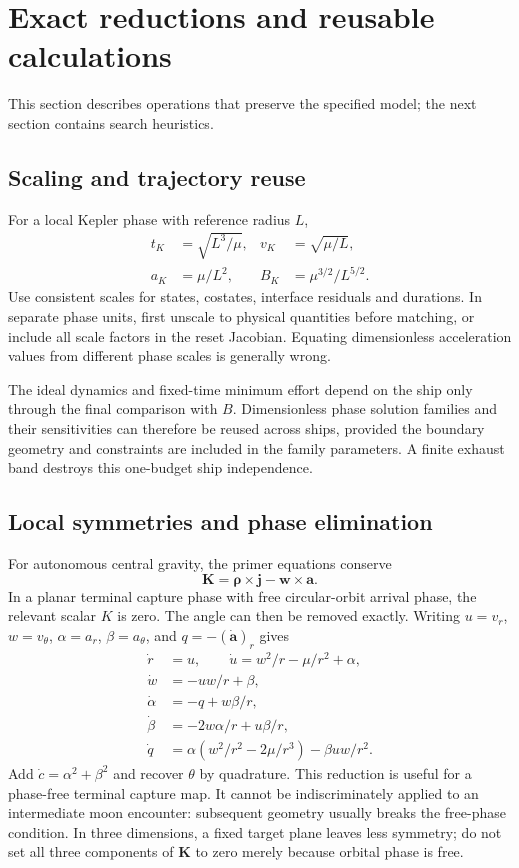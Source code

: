 \documentclass[journal, a4paper]{IEEEtran}
\newcommand{\cross}{\mathbin{\times}}
\begin{document}
\section{Exact reductions and reusable calculations}
This section describes operations that preserve the specified model; the next section contains search heuristics.

\subsection{Scaling and trajectory reuse}
For a local Kepler phase with reference radius $L$,
\begin{align}
 t_K&=\sqrt{L^3/\mu}, &v_K&=\sqrt{\mu/L},\nonumber\\
 a_K&=\mu/L^2, & B_K&=\mu^{3/2}/L^{5/2}.
\end{align}
Use consistent scales for states, costates, interface residuals and durations. In separate phase units, first unscale to physical quantities before matching, or include all scale factors in the reset Jacobian. Equating dimensionless acceleration values from different phase scales is generally wrong.

The ideal dynamics and fixed-time minimum effort depend on the ship only through the final comparison with $B$. Dimensionless phase solution families and their sensitivities can therefore be reused across ships, provided the boundary geometry and constraints are included in the family parameters. A finite exhaust band destroys this one-budget ship independence.

\subsection{Local symmetries and phase elimination}
For autonomous central gravity, the primer equations conserve
\begin{equation}
 \mathbf K=\boldsymbol\rho\cross\mathbf j-\mathbf w\cross\mathbf a.
\end{equation}
In a planar terminal capture phase with free circular-orbit arrival phase, the relevant scalar $K$ is zero. The angle can then be removed exactly. Writing $u=v_r$, $w=v_\theta$, $\alpha=a_r$, $\beta=a_\theta$, and $q=-(\dot{\mathbf a})_r$ gives
\begin{align}
 \dot r&=u,\qquad \dot u=w^2/r-\mu/r^2+\alpha,\nonumber\\
 \dot w&=-uw/r+\beta,\nonumber\\
 \dot\alpha&=-q+w\beta/r,\nonumber\\
 \dot\beta&=-2w\alpha/r+u\beta/r,\label{eq:reduced}\\
 \dot q&=\alpha(w^2/r^2-2\mu/r^3)-\beta uw/r^2.\nonumber
\end{align}
Add $\dot c=\alpha^2+\beta^2$ and recover $\theta$ by quadrature. This reduction is useful for a phase-free terminal capture map. It cannot be indiscriminately applied to an intermediate moon encounter: subsequent geometry usually breaks the free-phase condition. In three dimensions, a fixed target plane leaves less symmetry; do not set all three components of $\mathbf K$ to zero merely because orbital phase is free.
\end{document}
